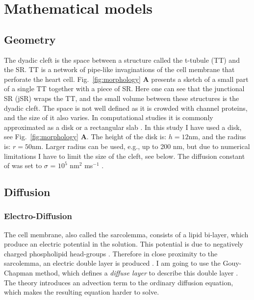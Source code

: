 \section{Mathematical models}
\label{sec:mathematical-models}

\subsection{Geometry}
\label{sec:geometry}
The dyadic cleft is the space between a structure called the t-tubule (TT) and the SR. TT is a network of pipe-like invaginations of the cell membrane that perforate the heart cell\cite{Soel_1999_266}. Fig.~\ref{fig:morphology} \textbf{A} presents a sketch of a small part of a single TT together with a piece of SR. Here one can see that the junctional SR (jSR) wraps the TT, and the small volume between these structures is the dyadic cleft. The space is not well defined as it is crowded with channel proteins, and the size of it also varies. In computational studies it is commonly approximated as a disk or a rectangular slab \cite{Pesk_1992_59,Soel_1997_97,Koh_2006_1999,Tans_2007_3379}. In this study I have used a disk, see Fig.~\ref{fig:morphology} \textbf{A}. The height of the disk is: $h = 12$nm, and the radius is: $r = 50$nm. Larger radius can be used, e.g., up to 200 nm, but due to numerical limitations I have to limit the size of the cleft, see below. The diffusion constant of \Ca was set to $\sigma$ = $10^5$ nm$^2$ ms$^{-1}$ \cite{Lang_1996_1169}.\par

\subsection{\Ca Diffusion}
\label{sec:ca-diffusion}

\subsubsection{Electro-Diffusion}
The cell membrane, also called the sarcolemma, consists of a lipid bi-layer, which produce an electric potential in the solution. This potential is due to negatively charged phospholipid head-groups \cite{McLa_1971_667,Lang_1990_335}. Therefore in close proximity to the sarcolemma, an electric double layer is produced \cite{Bard_2001_book}. I am going to use the Gouy-Chapman method, which defines a \textit{diffuse layer} to describe this double layer \cite{Grah_1947_441}. The theory introduces an advection term to the ordinary diffusion equation, which makes the resulting equation harder to solve. \par

